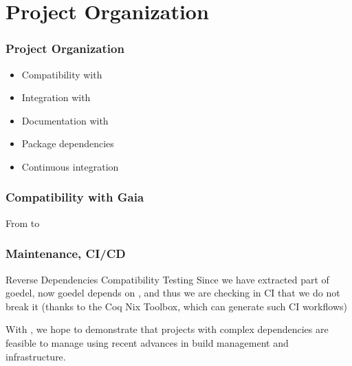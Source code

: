 \documentclass[10pt, fleqn]{beamer}
\begin{document}
\section{Project Organization}
\begin{frame}
  \frametitle{Project  Organization}
  \begin{itemize}
   \item Compatibility with \gaia
  \item Integration with \community
  \item Documentation with \alectr
  \item Package dependencies
  \item Continuous integration
  \end{itemize}
\end{frame}



\begin{frame}
  \frametitle{Compatibility with Gaia}
  \begin{block}{From \Hydras to \gaia}
    {\footnotesize
      }
  \end{block}
\end{frame}

\begin{frame}
  \frametitle{Maintenance, CI/CD}
 

  \begin{block}{Reverse Dependencies Compatibility Testing}
    Since we have extracted part of {\color{plugincolor}goedel}, now {\color{plugincolor}goedel} depends on {\color{plugincolor}\Hydras}, and thus we are checking in CI that we do not break it (thanks to the \textcolor{lookcolor}{Coq Nix Toolbox},
    which can generate such CI workflows)
  \end{block}

  \begin{block}{}
  {\color{lookcolor}  With \Hydras, we hope to demonstrate that projects with complex dependencies are feasible to manage using recent advances in build management and infrastructure.}
  \end{block}

\end{frame}

\end{document}
